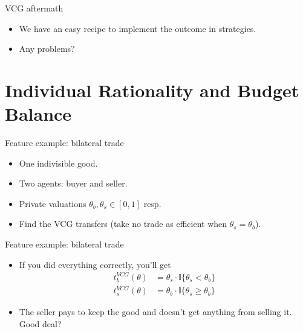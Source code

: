 \documentclass[english,10pt
,aspectratio=169
]{beamer}
\begin{document}
\begin{frame}{VCG aftermath}
\begin{itemize}
	\item We have an easy recipe to implement the  outcome in  strategies.
	\item Any problems?
\end{itemize}
\end{frame}


\section{Individual Rationality and Budget Balance}

\begin{frame}{Feature example: bilateral trade}
\begin{example}
	\begin{itemize}
		\item One indivisible good.
		\item Two agents: buyer and seller. 
		\item Private valuations $\theta_b,\theta_s \in [0,1]$ resp.
		\item Find the VCG transfers (take no trade as efficient when $\theta_s = \theta_b$).
	\end{itemize}
\end{example}
\end{frame}


\begin{frame}{Feature example: bilateral trade}
\begin{itemize}
	\item If you did everything correctly, you'll get
	\begin{align*}
		t_b^{VCG}(\theta) &= \theta_s \cdot \mathbb{I} \{ \theta_s < \theta_b \} 
		\\ t_s^{VCG}(\theta) &= \theta_b \cdot \mathbb{I} \{ \theta_s \geq \theta_b \} 
	\end{align*}
	\pause
	\item The seller pays to keep the good and doesn't get anything from selling it. Good deal?
\end{itemize}
\end{frame}
\end{document}
